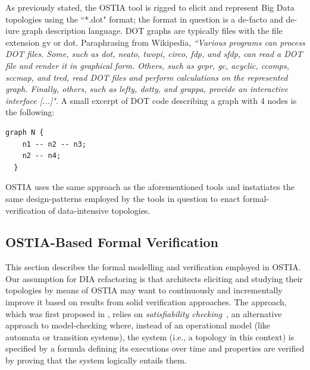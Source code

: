 {\color{blue}
As previously stated, the OSTIA tool is rigged to elicit and represent Big Data topologies using the ``*.dot" format; the format in question is a de-facto and de-iure graph description language. DOT graphs are typically files with the file extension gv or dot. Paraphrasing from Wikipedia, \emph{``Various programs can process DOT files. Some, such as dot, neato, twopi, circo, fdp, and sfdp, can read a DOT file and render it in graphical form. Others, such as gvpr, gc, acyclic, ccomps, sccmap, and tred, read DOT files and perform calculations on the represented graph. Finally, others, such as lefty, dotty, and grappa, provide an interactive interface [...]"}. 
A small excerpt of DOT code describing a graph with 4 nodes is the following:

\begin{lstlisting}[basicstyle=\normalfont\ttfamily\small,tabsize=12,caption=DOT script describing an undirected graph N with four nodes.]
  graph N {
  	n1 -- n2 -- n3;
 	n2 -- n4;
  } 
\end{lstlisting}
OSTIA uses the same approach as the aforementioned tools and instatiates the same design-patterns employed by the tools in question to enact formal-verification of data-intensive topologies.
}
%
\subsection{OSTIA-Based Formal Verification}\label{ver}\label{verification}


This section describes the formal modelling and verification employed in OSTIA. Our assumption for DIA refactoring is that architects eliciting and studying their topologies by means of OSTIA may want to continuously and incrementally improve it based on results from solid verification approaches. The approach, which was first proposed in \cite{MBER16}, relies on \textit{satisfiability checking}~\cite{MPS13}, an alternative approach to model-checking where, instead of an operational model (like automata or transition systems), the system (i.e., a topology in this context) is specified by a formula defining its executions over time and properties are verified by proving that the system logically entails them.

